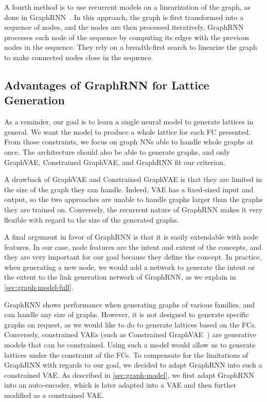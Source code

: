A fourth method is to use recurrent models on a linearization of the graph, as done in GraphRNN~\cite{graphrnn:2018:jiaxuan}.
In this approach, the graph is first transformed into a sequence of nodes, and the nodes are then processed iteratively.
GraphRNN processes each node of the sequence by computing its edges with the previous nodes in the sequence.
They rely on a breadth-first search to linearize the graph to make connected nodes close in the sequence.

\subsection{Advantages of GraphRNN for Lattice Generation\label{sec:graphrnn-choice}}
As a reminder, our goal is to learn a single neural model to generate lattices in general. We want the model to produce a whole lattice for each FC presented.
From those constraints, we focus on graph NNs able to handle whole graphs at once.
The architecture should also be able to generate graphs, and only GraphVAE, Constrained GraphVAE, and GraphRNN fit our criterion.

A drawback of GraphVAE and Constrained GraphVAE is that they are limited in the size of the graph they can handle.
Indeed, VAE has a fixed-sized input and output, so the two approaches are unable to handle graphs larger than the graphs they are trained on.
Conversely, the recurrent nature of GraphRNN makes it very flexible with regard to the size of the generated graphs.

A final argument in favor of GraphRNN is that it is easily extendable with node features.
In our case, node features are the intent and extent of the concepts, and they are very important for our goal because they define the concept.
In practice, when generating a new node, we would add a network to generate the intent or the extent to the link generation network of GraphRNN, as we explain in \cref{sec:graph-model-full}.

GraphRNN shows \soa{} performance when generating graphs of various families, and can handle any size of graphs.
However, it is not designed to generate specific graphs on request, as we would like to do to generate lattices based on the FCs.
Conversely, constrained VAEs (such as Constrained GraphVAE~\cite{constrained-graph-vae:2018:ma}) are generative models that can be constrained.
Using such a model would allow us to generate lattices under the constraint of the FCs.
To compensate for the limitations of GraphRNN with regards to our goal, we decided to adapt GraphRNN into such a constrained VAE.
As described in \cref{sec:graph-model}, we first adapt GraphRNN into an auto-encoder, which is later adapted into a VAE and then further modified as a constrained VAE.

